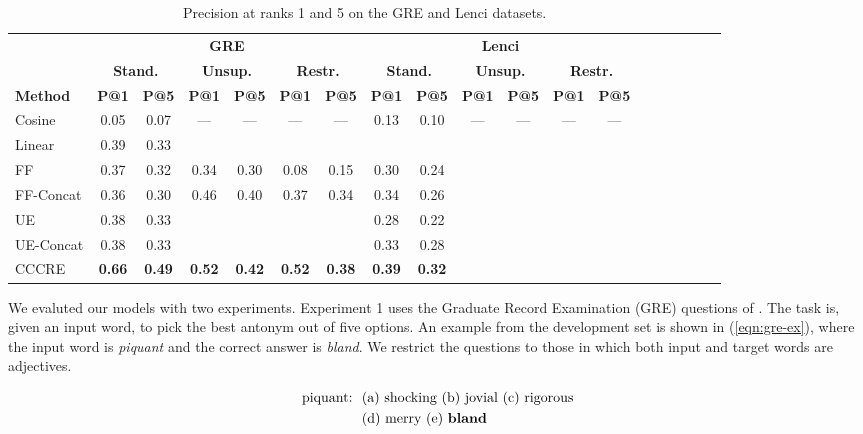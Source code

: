 \documentclass[11pt]{article}
\begin{document}
\begin{table}[t!]
\centering
\setlength\tabcolsep{1.5pt}
\begin{tabular}{l|cc|cc|cc|cc|cc|cc|cc|cc|cc|}
\hline
& \multicolumn{6}{c|}{\bf GRE} & \multicolumn{6}{c}{\bf Lenci} \\
& \multicolumn{2}{c|}{\bf Stand.} & \multicolumn{2}{c|}{\bf Unsup.} & \multicolumn{2}{c|}{\bf Restr.} & \multicolumn{2}{c|}{\bf Stand.} & \multicolumn{2}{c|}{\bf Unsup.} & \multicolumn{2}{c}{\bf Restr.} \\
\bf Method & \bf P@1 & \bf P@5  & \bf P@1 & \bf P@5  & \bf P@1 & \bf P@5  & \bf P@1 & \bf P@5  & \bf P@1 & \bf P@5  & \bf P@1 & \bf P@5  \\
\hline
\hline
Cosine & 0.05 & 0.07 & --- & --- & --- & --- & 0.13 & 0.10 & --- & --- & --- & --- \\
Linear & 0.39 & 0.33 & & & & & & & & & & \\
\hline
FF & 0.37 & 0.32 & 0.34 & 0.30 & 0.08 & 0.15 & 0.30 & 0.24 & & & & \\
FF-Concat & 0.36 & 0.30 & 0.46 & 0.40 & 0.37 & 0.34 & 0.34 &  0.26 & & & \\
UE & 0.38 & 0.33 & & & & & 0.28  & 0.22 & & & & \\
UE-Concat & 0.38 & 0.33 & & & & & 0.33 & 0.28 & & & & & \\
CCCRE  & \bf 0.66 & \bf 0.49 & \bf 0.52 & \bf 0.42 & \bf 0.52 & \bf 0.38 & \bf 0.39 & \bf 0.32 & & & & \\
\end{tabular} 
\label{t:prec}
\caption{Precision at ranks 1 and 5 on the GRE and Lenci datasets.}
\end{table}




We evaluted our models with two experiments. Experiment 1 uses the Graduate Record Examination (GRE) questions of \citet{mohammad:13}. The task is, given an input word, to pick the best antonym out of five options. An example from the development set is shown in (\ref{eqn:gre-ex}), where the input word is {\it piquant} and the correct answer is {\it bland}. We restrict the questions to those in which both input and target words are adjectives.

\begin{equation}
\begin{split}
\textrm{piquant:\ \ } & \textrm{(a) shocking (b) jovial (c) rigorous} \\
& \textrm{(d) merry (e) {\bf bland}}
\label{eqn:gre-ex}
\end{split}
\end{equation}
\end{document}
